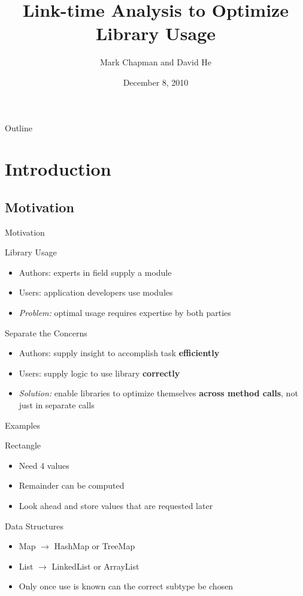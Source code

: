 \documentclass{beamer}
\title[LTO]{Link-time Analysis to Optimize Library Usage}
\author[Chapman and He]{Mark Chapman and David He}
\institute[CS 706]{CS 706 Final Project}
\date[2010-12-08]{December 8, 2010}
\begin{document}
\begin{frame}
  \titlepage
\end{frame}

\begin{frame}{Outline}
  \tableofcontents
\end{frame}

\section{Introduction}

\subsection{Motivation}
\begin{frame}{Motivation}
  \begin{block}{Library Usage}
    \begin{itemize}
    \item Authors: experts in field supply a module
    \item Users: application developers use modules
    \item {\it Problem:} optimal usage requires expertise by both parties
    \end{itemize}
  \end{block}
\pause
  \begin{block}{Separate the Concerns}
    \begin{itemize}
    \item Authors: supply insight to accomplish task {\bf efficiently}
    \item Users: supply logic to use library {\bf correctly}
    \item {\it Solution:} enable libraries to optimize themselves {\bf across method calls}, not just in separate calls
    \end{itemize}
  \end{block}
\end{frame}

\begin{frame}{Examples} %
  \begin{block}{Rectangle}
    \begin{itemize}
    \item Need 4 values
    \item Remainder can be computed
\pause
    \item Look ahead and store values that are requested later
    \end{itemize}
  \end{block}
\pause
  \begin{block}{Data Structures}
    \begin{itemize}
    \item Map $\rightarrow$ HashMap or TreeMap
    \item List $\rightarrow$ LinkedList or ArrayList
    \item Only once use is known can the correct subtype be chosen
    \end{itemize}
  \end{block}
\end{frame}
\end{document}

